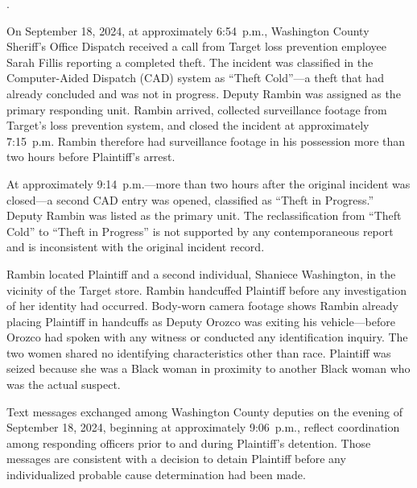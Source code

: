 \documentclass[12pt,letterpaper]{article}
\newcounter{complaintpara}
\newenvironment{paras}{%
	\begin{list}{\arabic{complaintpara}.}{%
			\setlength{\leftmargin}{0.5in}%
			\setlength{\labelwidth}{0.4in}%
			\setlength{\labelsep}{0.1in}%
			\setlength{\itemsep}{0pt}%
			\setlength{\parsep}{0pt}%
			\setlength{\topsep}{6pt}%
		}%
	}{%
	\end{list}%
}
\begin{document}
	\begin{paras}
		
		\item\label{fact:cad1} On September 18, 2024, at approximately
		6:54~p.m., Washington County Sheriff's Office Dispatch received
		a call from Target loss prevention employee Sarah Fillis
		reporting a completed theft. The incident was classified in the
		Computer-Aided Dispatch (CAD) system as ``Theft Cold''---a
		theft that had already concluded and was not in progress.
		Deputy Rambin was assigned as the primary responding unit.
		Rambin arrived, collected surveillance footage from Target's
		loss prevention system, and closed the incident at
		approximately 7:15~p.m. Rambin therefore had surveillance
		footage in his possession more than two hours before
		Plaintiff's arrest.
		
		\item\label{fact:cad2} At approximately 9:14~p.m.---more than two
		hours after the original incident was closed---a second CAD
		entry was opened, classified as ``Theft in Progress.'' Deputy
		Rambin was listed as the primary unit. The reclassification
		from ``Theft Cold'' to ``Theft in Progress'' is not supported
		by any contemporaneous report and is inconsistent with the
		original incident record.
		
		\item\label{fact:arrest} Rambin located Plaintiff and a second
		individual, Shaniece Washington, in the vicinity of the Target
		store. Rambin handcuffed Plaintiff before any investigation of
		her identity had occurred. Body-worn camera footage shows
		Rambin already placing Plaintiff in handcuffs as Deputy Orozco
		was exiting his vehicle---before Orozco had spoken with any
		witness or conducted any identification inquiry. The two women
		shared no identifying characteristics other than race.
		Plaintiff was seized because she was a Black woman in proximity
		to another Black woman who was the actual suspect.
		
		\item\label{fact:texts} Text messages exchanged among Washington
		County deputies on the evening of September 18, 2024,
		beginning at approximately 9:06~p.m., reflect coordination
		among responding officers prior to and during Plaintiff's
		detention. Those messages are consistent with a decision to
		detain Plaintiff before any individualized probable cause
		determination had been made.
		

\end{paras}
\end{document}

